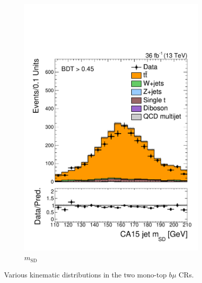 \begin{figure}[]
\begin{center}
\begin{subfigure}[t]{0.32\textwidth}
            \includegraphics[width=\textwidth]{figures/monotop/prefit/singlemuontop_tight_fj1MSD.pdf}
            \caption{$m_\mathrm{SD}$}
        \end{subfigure}
        \caption{Various kinematic distributions in the two mono-top $b\mu$ CRs. }
        \label{fig:mt:prefit_tmn}
    \end{center}
\end{figure}

